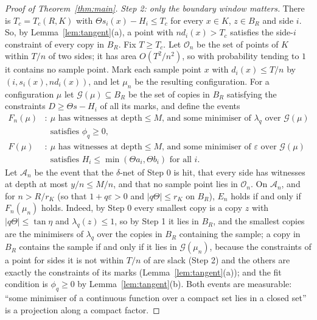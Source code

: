 \documentclass[11pt]{amsart}
\theoremstyle{remark}\newtheorem{remark}[theorem]{Remark}
\begin{document}
\begin{proof}[Proof of Theorem~\ref{thm:main}]
\emph{Step 2: only the boundary window matters.} There is $T_c=T_c(R,K)$ with $\Theta s_i(x)-H_i\le T_c$ for every
$x\in K$, $z\in B_R$ and side $i$. So, by Lemma~\ref{lem:tangent}(a), a point with $nd_i(x)>T_c$ satisfies the side-$i$
constraint of every copy in $B_R$. Fix $T\ge T_c$. Let $\mathcal O_n$ be the set of points of $K$ within $T/n$ of two
sides; it has area $O(T^2/n^2)$, so with probability tending to $1$ it contains no sample point. Mark each sample point
$x$ with $d_i(x)\le T/n$ by $(i,s_i(x),nd_i(x))$, and let $\mu_n$ be the resulting configuration. For a configuration
$\mu$ let $\mathcal G(\mu)\subseteq B_R$ be the set of copies in $B_R$ satisfying the constraints $D\ge\Theta s-H_i$
of all its marks, and define the events
\begin{align*}
F_n(\mu)&:\ \mu\text{ has witnesses at depth}\le M\text{, and some minimiser of }\lambda_q\text{ over }\mathcal
G(\mu)\\&\phantom{:\ }\text{satisfies }\phi_q\ge0,\\
F(\mu)&:\ \mu\text{ has witnesses at depth}\le M\text{, and some minimiser of }\varepsilon\text{ over }\mathcal
G(\mu)\\&\phantom{:\ }\text{satisfies }H_i\le\min(\Theta a_i,\Theta b_i)\text{ for all }i .
\end{align*}
Let $\mathcal A_n$ be the event that the $\delta$-net of Step 0 is hit, that every side has witnesses at depth at most
$y/n\le M/n$, and that no sample point lies in $\mathcal O_n$. On $\mathcal A_n$, and for $n>R/r_K$ (so that
$1+q\varepsilon>0$ and $|q\Theta|\le r_K$ on $B_R$), $E_n$ holds if and only if $F_n(\mu_n)$ holds. Indeed, by Step 0 every smallest copy is a copy $z$ with $|q\Theta|\le\tan\eta$ and
$\lambda_q(z)\le1$, so by Step 1 it lies in $B_R$, and the smallest copies are the minimisers of $\lambda_q$ over the copies in $B_R$
containing the sample; a copy in $B_R$ contains the sample if and only if it lies in
$\mathcal G(\mu_n)$, because the constraints of a point for sides it is not within $T/n$ of are slack (Step 2) and the
others are exactly the constraints of its marks (Lemma~\ref{lem:tangent}(a)); and the fit condition is $\phi_q\ge0$ by
Lemma~\ref{lem:tangent}(b). Both events are measurable: ``some minimiser of a continuous
function over a compact set lies in a closed set'' is a projection along a compact factor.


\end{proof}
\end{document}
